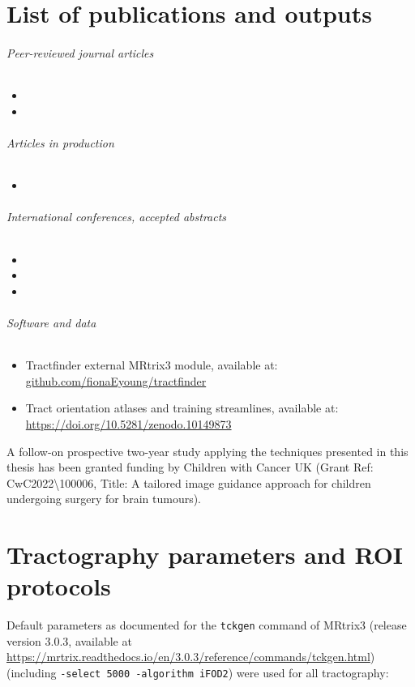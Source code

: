 \documentclass[12pt,phd,a4paper,twoside]{ucl_thesis}
\begin{document}
\chapter*{List of publications and outputs}

\subparagraph*{Peer-reviewed journal articles}
\begin{itemize}
  \item[] 
  \item[] 
\end{itemize}
\subparagraph*{Articles in production}
\begin{itemize}
  \item[] 
\end{itemize}
\subparagraph*{International conferences, accepted abstracts}
\begin{itemize}
  \item[] 
  \item[] 
  \item[] 
\end{itemize}

\subparagraph*{Software and data}
\begin{itemize}
  \item[] Tractfinder external MRtrix3 module, available at: \url{github.com/fionaEyoung/tractfinder}
  \item[] Tract orientation atlases and training streamlines, available at: \url{https://doi.org/10.5281/zenodo.10149873}
\end{itemize}

\noindent A follow-on prospective two-year study applying the techniques presented in this thesis has been granted funding by Children with Cancer UK (Grant Ref: CwC2022\textbackslash100006, Title:  A tailored image guidance approach for children undergoing surgery for brain tumours).
\clearpage{}

\clearpage{}
\appendix
{}

\chapter{Tractography parameters and ROI protocols}
\label{app:rois}

Default parameters as documented for the \verb|tckgen| command of MRtrix3 (release version 3.0.3, available at \url{https://mrtrix.readthedocs.io/en/3.0.3/reference/commands/tckgen.html}) (including \verb|-select 5000 -algorithm iFOD2|) were used for all tractography:
\end{document}
